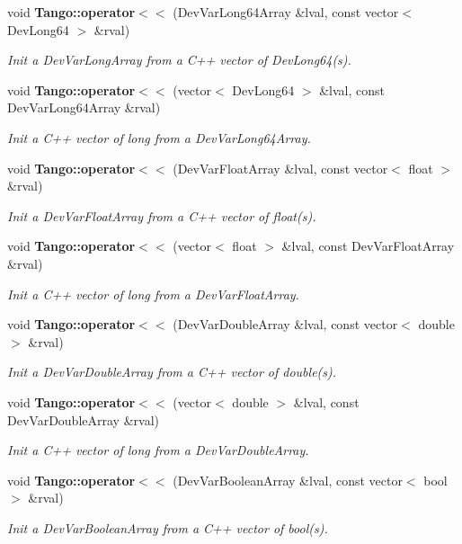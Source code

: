 \begin{DoxyCompactItemize}
void {\bf Tango\-::operator$<$$<$} (Dev\-Var\-Long64\-Array \&lval, const vector$<$ Dev\-Long64 $>$ \&rval)
\begin{DoxyCompactList}\small\item\em Init a Dev\-Var\-Long\-Array from a C++ vector of Dev\-Long64(s). \end{DoxyCompactList}\item 
void {\bf Tango\-::operator$<$$<$} (vector$<$ Dev\-Long64 $>$ \&lval, const Dev\-Var\-Long64\-Array \&rval)
\begin{DoxyCompactList}\small\item\em Init a C++ vector of long from a Dev\-Var\-Long64\-Array. \end{DoxyCompactList}\item 
void {\bf Tango\-::operator$<$$<$} (Dev\-Var\-Float\-Array \&lval, const vector$<$ float $>$ \&rval)
\begin{DoxyCompactList}\small\item\em Init a Dev\-Var\-Float\-Array from a C++ vector of float(s). \end{DoxyCompactList}\item 
void {\bf Tango\-::operator$<$$<$} (vector$<$ float $>$ \&lval, const Dev\-Var\-Float\-Array \&rval)
\begin{DoxyCompactList}\small\item\em Init a C++ vector of long from a Dev\-Var\-Float\-Array. \end{DoxyCompactList}\item 
void {\bf Tango\-::operator$<$$<$} (Dev\-Var\-Double\-Array \&lval, const vector$<$ double $>$ \&rval)
\begin{DoxyCompactList}\small\item\em Init a Dev\-Var\-Double\-Array from a C++ vector of double(s). \end{DoxyCompactList}\item 
void {\bf Tango\-::operator$<$$<$} (vector$<$ double $>$ \&lval, const Dev\-Var\-Double\-Array \&rval)
\begin{DoxyCompactList}\small\item\em Init a C++ vector of long from a Dev\-Var\-Double\-Array. \end{DoxyCompactList}\item 
void {\bf Tango\-::operator$<$$<$} (Dev\-Var\-Boolean\-Array \&lval, const vector$<$ bool $>$ \&rval)
\begin{DoxyCompactList}\small\item\em Init a Dev\-Var\-Boolean\-Array from a C++ vector of bool(s). \end{DoxyCompactList}\item 

\end{DoxyCompactItemize}
